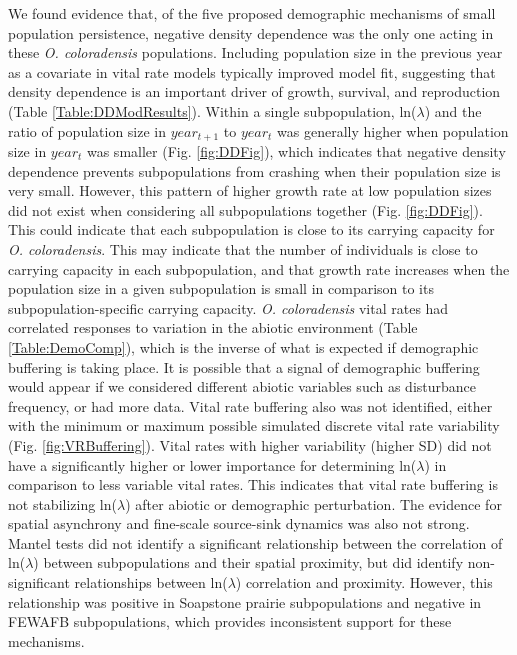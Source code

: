 \documentclass[12pt, letterpaper]{article}
\begin{document}
We found evidence that, of the five proposed demographic mechanisms of small population persistence, negative density dependence was the only one acting in these \textit{O. coloradensis} populations. Including population size in the previous year as a covariate in vital rate models typically improved model fit, suggesting that density dependence is an important driver of growth, survival, and reproduction (Table \ref{Table:DDModResults}). Within a single subpopulation, ln($\lambda$) and the ratio of population size in $year_{t+1}$ to $year_{t}$ was generally higher when population size in $year_{t}$ was smaller (Fig. \ref{fig:DDFig}), which indicates that negative density dependence prevents subpopulations from crashing when their population size is very small.  However, this pattern of higher growth rate at low population sizes did not exist when considering all subpopulations together (Fig. \ref{fig:DDFig}). This could indicate that each subpopulation is close to its carrying capacity for \textit{O. coloradensis}. This may indicate that the number of individuals is close to carrying capacity in each subpopulation, and that growth rate increases when the population size in a given subpopulation is small in comparison to its subpopulation-specific carrying capacity. \textit{O. coloradensis} vital rates had correlated responses to variation in the abiotic environment (Table \ref{Table:DemoComp}), which is the inverse of what is expected if demographic buffering is taking place. It is possible that a signal of demographic buffering would appear if we considered different abiotic variables such as disturbance frequency, or had more data. Vital rate buffering also was not identified, either with the minimum or maximum possible simulated discrete vital rate variability (Fig. \ref{fig:VRBuffering}). Vital rates with higher variability (higher SD) did not have a significantly higher or lower importance for determining ln($\lambda$) in comparison to less variable vital rates. This indicates that vital rate buffering is not stabilizing ln($\lambda$) after abiotic or demographic perturbation. The evidence for spatial asynchrony and fine-scale source-sink dynamics was also not strong. Mantel tests did not identify a significant relationship between the correlation of ln($\lambda$) between subpopulations and their spatial proximity, but did identify non-significant relationships between ln($\lambda$) correlation and proximity. However, this relationship was positive in Soapstone prairie subpopulations and negative in FEWAFB subpopulations, which provides inconsistent support for these mechanisms.  
\end{document}

